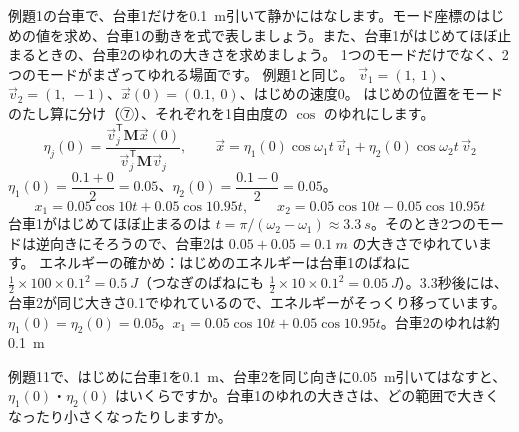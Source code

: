 \label{ph:波-3:ex11}
\begin{phreidai}
例題1の台車で、台車1だけを\qty{0.1}{m}引いて静かにはなします。モード座標のはじめの値を求め、台車1の動きを式で表しましょう。また、台車1がはじめてほぼ止まるときの、台車2のゆれの大きさを求めましょう。
\phbamen
1つのモードだけでなく、2つのモードがまざってゆれる場面です。
\phmushi
例題1と同じ。
\phzu
$\vec v_1=(1,\ 1)$、$\vec v_2=(1,\ -1)$、$\vec x(0)=(0.1,\ 0)$、はじめの速度0。
\phriyu
はじめの位置をモードのたし算に分け（⑦）、それぞれを1自由度の $\cos$ のゆれにします。
\phtateru
\[\eta_j(0)=\frac{\vec v_j^{\mathsf T}\mathbf M\vec x(0)}{\vec v_j^{\mathsf T}\mathbf M\vec v_j},\qquad\vec x=\eta_1(0)\cos\omega_1t\,\vec v_1+\eta_2(0)\cos\omega_2t\,\vec v_2\]
\phtoku
$\eta_1(0)=\dfrac{0.1+0}{2}=0.05$、$\eta_2(0)=\dfrac{0.1-0}{2}=0.05$。
\[x_1=0.05\cos10t+0.05\cos10.95t,\qquad x_2=0.05\cos10t-0.05\cos10.95t\]
台車1がはじめてほぼ止まるのは $t=\pi/(\omega_2-\omega_1)\approx\qty{3.3}{s}$。そのとき2つのモードは逆向きにそろうので、台車2は $0.05+0.05=\qty{0.1}{m}$ の大きさでゆれています。
\phtashikame
エネルギーの確かめ：はじめのエネルギーは台車1のばねに $\tfrac12\times100\times0.1^2=\qty{0.5}{J}$（つなぎのばねにも $\tfrac12\times10\times0.1^2=\qty{0.05}{J}$）。3.3秒後には、台車2が同じ大きさ0.1でゆれているので、エネルギーがそっくり移っています。
\kotae $\eta_1(0)=\eta_2(0)=0.05$。$x_1=0.05\cos10t+0.05\cos10.95t$。台車2のゆれは約\qty{0.1}{m}
\end{phreidai}
\begin{jibun}
例題11で、はじめに台車1を\qty{0.1}{m}、台車2を同じ向きに\qty{0.05}{m}引いてはなすと、$\eta_1(0)$・$\eta_2(0)$ はいくらですか。台車1のゆれの大きさは、どの範囲で大きくなったり小さくなったりしますか。
\end{jibun}

